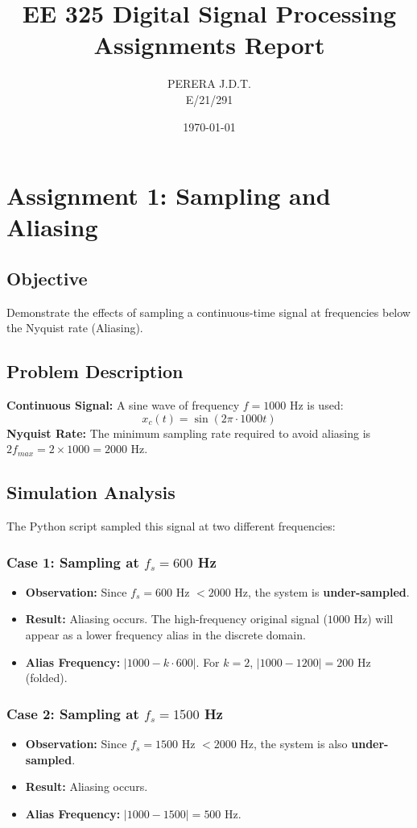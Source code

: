 \documentclass[11pt, a4paper]{article}
\title{EE 325 Digital Signal Processing \\ Assignments Report}
\author{PERERA J.D.T. \\ E/21/291}
\date{\today}
\begin{document}
\maketitle
\tableofcontents
\newpage

\section{Assignment 1: Sampling and Aliasing}
\subsection{Objective}
Demonstrate the effects of sampling a continuous-time signal at frequencies below the Nyquist rate (Aliasing).

\subsection{Problem Description}
\textbf{Continuous Signal:}
A sine wave of frequency $f = 1000$ Hz is used:
$$x_c(t) = \sin(2\pi \cdot 1000 t)$$
\textbf{Nyquist Rate:}
The minimum sampling rate required to avoid aliasing is $2f_{max} = 2 \times 1000 = 2000$ Hz.

\subsection{Simulation Analysis}
The Python script sampled this signal at two different frequencies:

\subsubsection{Case 1: Sampling at $f_s = 600$ Hz}
\begin{itemize}
    \item \textbf{Observation:} Since $f_s = 600$ Hz $< 2000$ Hz, the system is \textbf{under-sampled}.
    \item \textbf{Result:} Aliasing occurs. The high-frequency original signal ($1000$ Hz) will appear as a lower frequency alias in the discrete domain.
    \item \textbf{Alias Frequency:} $|1000 - k \cdot 600|$. For $k=2$, $|1000 - 1200| = 200$ Hz (folded).
\end{itemize}

\subsubsection{Case 2: Sampling at $f_s = 1500$ Hz}
\begin{itemize}
    \item \textbf{Observation:} Since $f_s = 1500$ Hz $< 2000$ Hz, the system is also \textbf{under-sampled}.
    \item \textbf{Result:} Aliasing occurs.
    \item \textbf{Alias Frequency:} $|1000 - 1500| = 500$ Hz.
\end{itemize}
\end{document}
